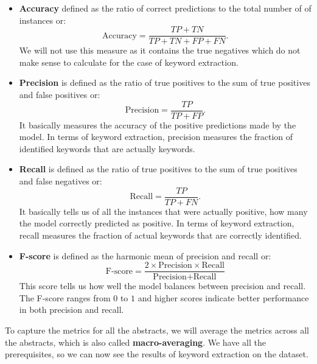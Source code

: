 \documentclass[12pt]{article}
\numberwithin{equation}{section}
\begin{document}
\begin{spacing}{1.5}
	\begin{itemize}
		\item \textbf{Accuracy} defined as the ratio of correct predictions to the total number of of instances or:
		$$ \text{Accuracy} = \frac{TP + TN}{TP + TN + FP + FN}. $$
		We will not use this measure as it contains the true negatives which do not make sense to calculate for the case of keyword extraction.
		\item \textbf{Precision} is defined as the ratio of true positives to the sum of true positives and false positives or:
		$$ \text{Precision} = \frac{TP}{TP + FP}. $$
		It basically measures the accuracy of the positive predictions made by the model. In terms of keyword extraction, precision measures the fraction of identified keywords that are actually keywords.
		
		\item \textbf{Recall} is defined as the ratio of true positives to the sum of true positives and false negatives or:
		$$ \text{Recall} = \frac{TP}{TP + FN}. $$
		It basically tells us of all the instances that were actually positive, how many the model correctly predicted as positive. In terms of keyword extraction, recall measures the fraction of actual keywords that are correctly identified.
		\item \textbf{F-score} is defined as the harmonic mean of precision and recall or:
		$$ \text{F-score} = \frac{2 \times \text{Precision} \times \text{Recall}}{\text{Precision} + \text{Recall}} $$
		This score tells us how well the model balances between precision and recall. The F-score ranges from $0$ to $1$ and higher scores indicate better performance in both precision and recall.  
	\end{itemize}
	To capture the metrics for all the abstracts, we will average the metrics across all the abstracts, which is also called \textbf{macro-averaging}. We have all the prerequisites, so we can now see the results of keyword extraction on the dataset.
	\newpage

\end{spacing}
\end{document}
